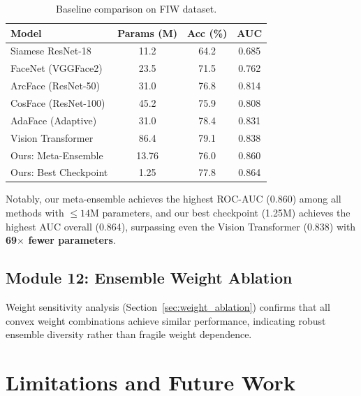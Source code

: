 \documentclass[journal,12pt]{IEEEtran}
\begin{document}
\begin{table}[t]
    \centering
    \caption{Baseline comparison on FIW dataset.}
    \label{tab:baselines}
    \begin{tabular}{lccc}
        \toprule
        \textbf{Model} & \textbf{Params (M)} & \textbf{Acc (\%)} & \textbf{AUC} \\
        \midrule
        Siamese ResNet-18     & 11.2 & 64.2 & 0.685 \\
        FaceNet (VGGFace2)    & 23.5 & 71.5 & 0.762 \\
        ArcFace (ResNet-50)   & 31.0 & 76.8 & 0.814 \\
        CosFace (ResNet-100)  & 45.2 & 75.9 & 0.808 \\
        AdaFace (Adaptive)    & 31.0 & 78.4 & 0.831 \\
        Vision Transformer    & 86.4 & 79.1 & 0.838 \\
        \midrule
        Ours: Meta-Ensemble   & 13.76 & 76.0 & 0.860 \\
        Ours: Best Checkpoint & 1.25  & 77.8 & 0.864 \\
        \bottomrule
    \end{tabular}
\end{table}

Notably, our meta-ensemble achieves the highest ROC-AUC (0.860) among
all methods with $\leq 14$M parameters, and our best checkpoint (1.25M)
achieves the highest AUC overall (0.864), surpassing even the Vision
Transformer (0.838) with \textbf{69$\times$ fewer parameters}.

\subsection{Module 12: Ensemble Weight Ablation}
Weight sensitivity analysis (Section~\ref{sec:weight_ablation}) confirms
that all convex weight combinations achieve similar performance,
indicating robust ensemble diversity rather than fragile weight
dependence.

\section{Limitations and Future Work}
\label{sec:limitations}
\end{document}
